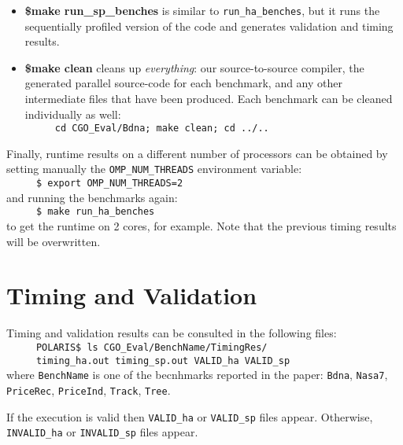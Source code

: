 \documentclass{sig-alternate}
\begin{document}
\begin{itemize}
    \item {\bf \$make run\_sp\_benches} is similar to {\tt run\_ha\_benches}, but it runs the
            sequentially profiled version of the code and generates validation and 
            timing results.

    \item {\bf \$make clean} cleans up {\em everything}: our source-to-source compiler,
            the generated parallel source-code for each benchmark, and 
            any other intermediate files that have been produced.
            Each benchmark can be cleaned individually as well:\\
            $\mbox{ }${\tt~~~~cd CGO\_Eval/Bdna; make clean; cd ../..}
\end{itemize}

Finally, runtime results on a different number of processors can be obtained
by setting manually the {\tt OMP\_NUM\_THREADS} environment variable:\\
$\mbox{ }${\tt~~~~\$ export OMP\_NUM\_THREADS=2}\\
\noindent and running the benchmarks again:\\
$\mbox{ }${\tt~~~~\$ make run\_ha\_benches}\\
to get the runtime on 2 cores, for example. 
Note that the previous timing results will be overwritten.

\section{Timing and Validation}
\label{sec:TimeValid}

Timing and validation results can be consulted in the following files:\\
$\mbox{ }${\tt~~~~POLARIS\$ ls CGO\_Eval/BenchName/TimingRes/}\\
$\mbox{ }${\tt~~~~timing\_ha.out  timing\_sp.out  VALID\_ha  VALID\_sp}\\
\noindent where {\tt BenchName} is one of the becnhmarks reported in the paper:
{\tt Bdna}, {\tt Nasa7}, {\tt PriceRec}, {\tt PriceInd}, {\tt Track}, {\tt Tree}.

If the execution is valid then {\tt VALID\_ha} or {\tt VALID\_sp} files appear.
Otherwise, {\tt INVALID\_ha} or {\tt INVALID\_sp} files appear. 
\end{document}
